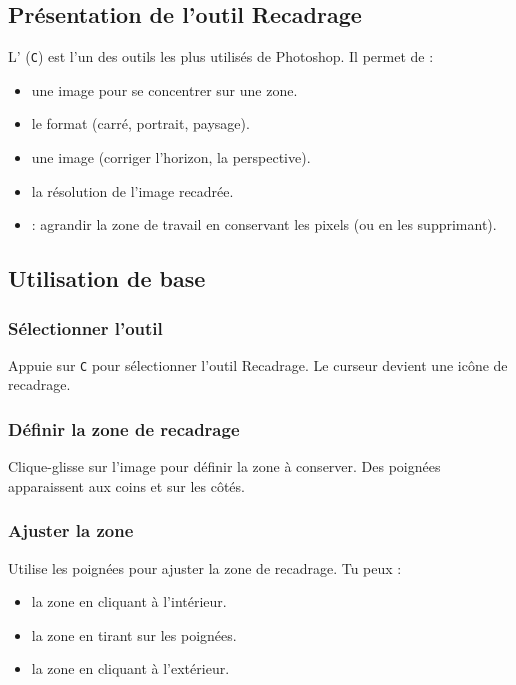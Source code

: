 \subsection{Présentation de l'outil Recadrage}

L' (\texttt{C}) est l'un des outils les plus utilisés de Photoshop. Il permet de :

\begin{itemize}
    \item {} une image pour se concentrer sur une zone.
    \item {} le format (carré, portrait, paysage).
    \item {} une image (corriger l'horizon, la perspective).
    \item {} la résolution de l'image recadrée.
    \item {} : agrandir la zone de travail en conservant les pixels (ou en les supprimant).
\end{itemize}

\subsection{Utilisation de base}

\subsubsection{Sélectionner l'outil}

Appuie sur \texttt{C} pour sélectionner l'outil Recadrage. Le curseur devient une icône de recadrage.

\subsubsection{Définir la zone de recadrage}

Clique-glisse sur l'image pour définir la zone à conserver. Des poignées apparaissent aux coins et sur les côtés.

\subsubsection{Ajuster la zone}

Utilise les poignées pour ajuster la zone de recadrage. Tu peux :

\begin{itemize}
    \item {} la zone en cliquant à l'intérieur.
    \item {} la zone en tirant sur les poignées.
    \item {} la zone en cliquant à l'extérieur.
\end{itemize}

